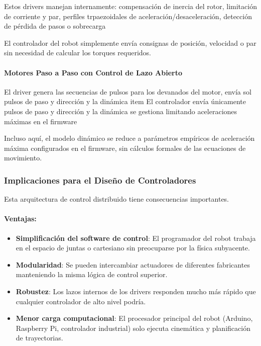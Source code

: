 Estos drivers manejan internamente: compensación de inercia del rotor, limitación de corriente y par, perfiles trpaezoidales de aceleración/desaceleración, detección de pérdida de pasos o sobrecarga

El controlador del robot simplemente envía consignas de posición, velocidad o par sin necesidad de calcular los torques requeridos.

\paragraph{Motores Paso a Paso con Control de Lazo Abierto}

El driver genera las secuencias de pulsos para los devanados del motor, envía sol pulsos de paso y dirección y la dinámica item El controlador envía únicamente pulsos de paso y dirección y la dinámica se gestiona limitando aceleraciones máximas en el firmware

Incluso aquí, el modelo dinámico se reduce a parámetros empíricos de aceleración máxima configurados en el firmware, sin cálculos formales de las ecuaciones de movimiento.

\subsubsection{Implicaciones para el Diseño de Controladores}

Esta arquitectura de control distribuido tiene consecuencias importantes.

\paragraph{Ventajas:}

\begin{itemize}
    \item \textbf{Simplificación del software de control}: El programador del robot trabaja en el espacio de juntas o cartesiano sin preocuparse por la física subyacente.
    
    \item \textbf{Modularidad}: Se pueden intercambiar actuadores de diferentes fabricantes manteniendo la misma lógica de control superior.
    
    \item \textbf{Robustez}: Los lazos internos de los drivers responden mucho más rápido que cualquier controlador de alto nivel podría.
    
    \item \textbf{Menor carga computacional}: El procesador principal del robot (Arduino, Raspberry Pi, controlador industrial) solo ejecuta cinemática y planificación de trayectorias.
\end{itemize}

